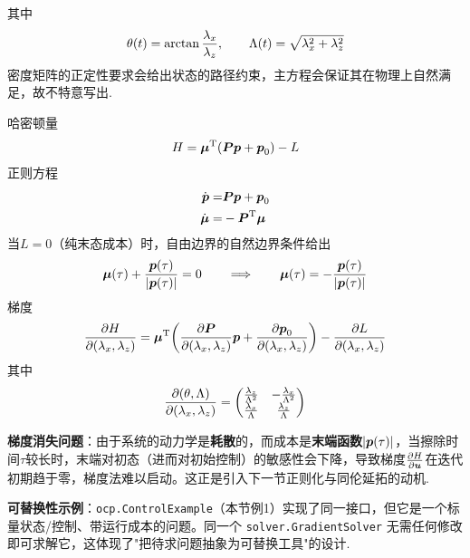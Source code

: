 \documentclass[UTF8]{article}
\numberwithin{equation}{section}
\begin{document}
        其中
        \begin{align}
            \theta\pqty{t}=\arctan\frac{\lambda_x}{\lambda_z}, \qquad \Lambda\pqty{t}=\sqrt{\lambda_x^2+\lambda_z^2}
        \end{align}
        密度矩阵的正定性要求会给出状态的路径约束，主方程会保证其在物理上自然满足，故不特意写出.
        \par
        哈密顿量
        \begin{align}
            H=\vb*{\mu}^\text{T}\pqty{\vb*{P}\vb*{p}+\vb*{p}_0}-L
        \end{align}
        正则方程
        \begin{align}
            \dot{\vb*{p}}=&\vb*{P}\vb*{p}+\vb*{p}_0\\
            \dot{\vb*{\mu}}=&-\vb*{P}^\text{T}\vb*{\mu}
        \end{align}
        当$L=0$（纯末态成本）时，自由边界的自然边界条件给出
        \begin{align}
            \vb*{\mu}\pqty{\tau}+\frac{\vb*{p}\pqty{\tau}}{\abs{\vb*{p}\pqty{\tau}}}=0
            \qquad\Longrightarrow\qquad
            \vb*{\mu}\pqty{\tau}=-\frac{\vb*{p}\pqty{\tau}}{\abs{\vb*{p}\pqty{\tau}}}
        \end{align}
        梯度
        \begin{align}
            \pdv{H}{\pqty{\lambda_x,\lambda_z}}=\vb*{\mu}^\text{T}\pqty{\pdv{\vb*{P}}{\pqty{\lambda_x,\lambda_z}}\vb*{p}+\pdv{\vb*{p}_0}{\pqty{\lambda_x,\lambda_z}}}-\pdv{L}{\pqty{\lambda_x,\lambda_z}}
        \end{align}
        其中
        \begin{align}
            \pdv{\pqty{\theta,\Lambda}}{\pqty{\lambda_x,\lambda_z}}=\pmqty{\frac{\lambda_z}{\Lambda^2}&-\frac{\lambda_x}{\Lambda^2}\\\frac{\lambda_x}{\Lambda}&\frac{\lambda_z}{\Lambda}}
        \end{align}
        \par
        \textbf{梯度消失问题}：由于系统的动力学是\textbf{耗散}的，而成本是\textbf{末端函数}$\abs{\vb*{p}\pqty{\tau}}$，当擦除时间$\tau$较长时，末端对初态（进而对初始控制）的敏感性会下降，导致梯度$\pdv{H}{\vb*{u}}$在迭代初期趋于零，梯度法难以启动。这正是引入下一节正则化与同伦延拓的动机.
        \par
        \textbf{可替换性示例}：\texttt{ocp.ControlExample}（本节例1）实现了同一接口，但它是一个标量状态/控制、带运行成本的问题。同一个 \texttt{solver.GradientSolver} 无需任何修改即可求解它，这体现了"把待求问题抽象为可替换工具"的设计.
\end{document}
